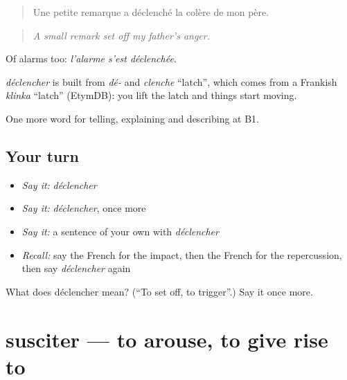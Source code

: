 \begin{quote}
Une petite remarque a déclenché la colère de mon père.
\end{quote}

\begin{quote}
\emph{A small remark set off my father's anger.}
\end{quote}

Of alarms too: \emph{l'alarme s'est déclenchée}.

\begin{cousinweb}
\emph{déclencher} is built from \emph{dé-} and \emph{clenche} \textquotedblleft{}latch\textquotedblright{}, which comes from a Frankish \emph{klinka} \textquotedblleft{}latch\textquotedblright{} (EtymDB): you lift the latch and things start moving.
\end{cousinweb}

\begin{grammarlens}[title={What you've built}]
One more word for telling, explaining and describing at B1.
\end{grammarlens}

\subsection*{Your turn}
\begin{itemize}
\raggedright
  \item \emph{Say it:} \emph{déclencher}
  \item \emph{Say it:} \emph{déclencher}, once more
  \item \emph{Say it:} a sentence of your own with \emph{déclencher}
  \item \emph{Recall:} say the French for the impact, then the French for the repercussion, then say \emph{déclencher} again
\end{itemize}

\begin{tcolorbox}[breakable,colback=teal!4,colframe=teal!35!black,title={Before you move on}]
What does déclencher mean? (\textquotedblleft{}To set off, to trigger\textquotedblright{}.) Say it once more.
\end{tcolorbox}
\section[susciter]{susciter — to arouse, to give rise to}

\label{lesson:FR-C350-susciter}



